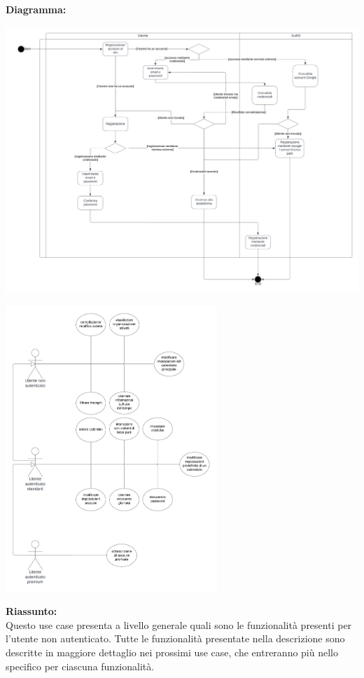 \begin{listaPersonale}[UC]{}
    \textbf{Diagramma:}
    \begin{center}
        \includegraphics[width=1\textwidth, height = 0.4\textheight]{img/Diagrammi/DS/DS_AccessoRegistrazione.png}
    \end{center}


    \newpage


    \begin{center}
        \includegraphics[width=0.6\textwidth, height = 0.5\textheight]{img/Diagrammi/UseCases/FunzionalitaUtenti.png}
    \end{center}
    \begin{listaPersonale2} [UC] {}
        \textbf{Riassunto:} \\
        Questo use case presenta a livello generale quali sono le funzionalità presenti per l'utente non autenticato. Tutte le funzionalità presentate nella descrizione sono descritte in maggiore dettaglio nei prossimi use case, che entreranno più nello specifico per ciascuna funzionalità.


\end{listaPersonale2}
\end{listaPersonale}
